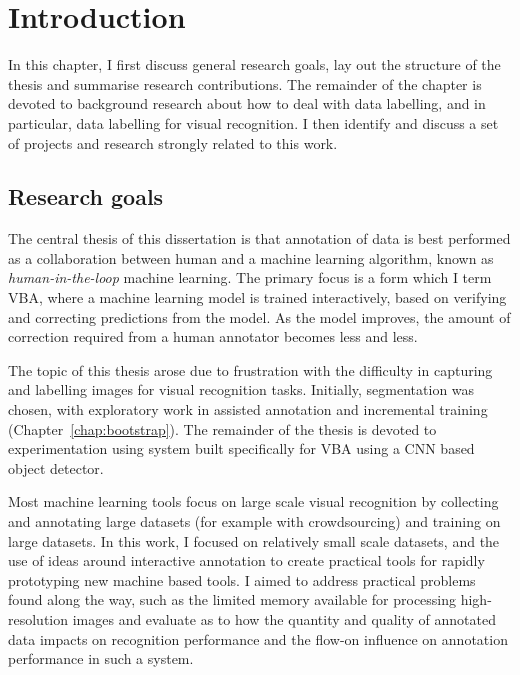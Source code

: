 \chapter{Introduction}
\label{chap:introduction}

In this chapter, I first discuss general research goals, lay out the structure of the thesis and summarise research contributions. The remainder of the chapter is devoted to background research about how to deal with data labelling, and in particular, data labelling for visual recognition. I then identify and discuss a set of projects and research strongly related to this work. 


\section{Research goals}
\label{sec:research_goals}

The central thesis of this dissertation is that annotation of data is best performed as a collaboration between human and a machine learning algorithm, known as \emph{human-in-the-loop} machine learning. The primary focus is a form which I term \gls{VBA}, where a machine learning model is trained interactively, based on verifying and correcting predictions from the model. As the model improves, the amount of correction required from a human annotator becomes less and less. 

The topic of this thesis arose due to frustration with the difficulty in capturing and labelling images for visual recognition tasks. Initially, segmentation was chosen, with exploratory work in assisted annotation and incremental training (Chapter~\ref{chap:bootstrap}). The remainder of the thesis is devoted to experimentation using system built specifically for \gls{VBA} using a \gls{CNN} based object detector.

Most machine learning tools focus on large scale visual recognition by collecting and annotating large datasets (for example with crowdsourcing) and training on large datasets. In this work, I focused on relatively small scale datasets, and the use of ideas around interactive annotation to create practical tools for rapidly prototyping new machine based tools. I aimed to address practical problems found along the way, such as the limited memory available for processing high-resolution images and evaluate as to how the quantity and quality of annotated data impacts on recognition performance and the flow-on influence on annotation performance in such a system.

